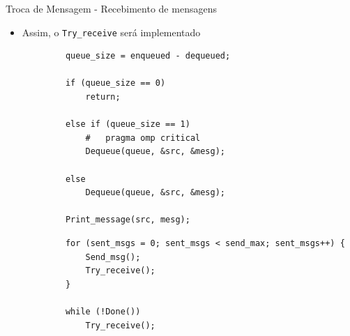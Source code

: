 	\begin{frame}[fragile]{Troca de Mensagem -  Recebimento de mensagens}
		\begin{itemize}
			\item Assim, o {\tt Try\_receive} será implementado
		\end{itemize}



		\begin{multicols}{2}
		\begin{verbatim}
			queue_size = enqueued - dequeued;

			if (queue_size == 0) 
				return;

			else if (queue_size == 1)
				#	pragma omp critical
				Dequeue(queue, &src, &mesg);

			else
				Dequeue(queue, &src, &mesg);

			Print_message(src, mesg);
		\end{verbatim}
		\columnbreak
		\begin{verbatim}
			for (sent_msgs = 0; sent_msgs < send_max; sent_msgs++) { 
				Send_msg();
				Try_receive();
			}
			
			while (!Done()) 
				Try_receive();
		\end{verbatim}
		\end{multicols}
\end{frame}

